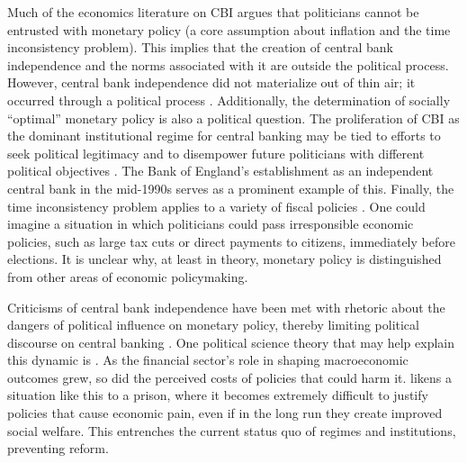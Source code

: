 \documentclass[12pt,a4paper]{article}
\begin{document}
\begin{doublespace}



Much of the economics literature on CBI argues that politicians cannot be entrusted with monetary policy (a core assumption about inflation and the time inconsistency problem). This implies that the creation of central bank independence and the norms associated with it are outside the political process. However, central bank independence did not materialize out of thin air; it occurred through a political process \parencite{mcnamara_rational_2002}. Additionally, the determination of socially ``optimal'' monetary policy is also a political question. The proliferation of CBI as the dominant institutional regime for central banking may be tied to efforts to seek political legitimacy and to disempower future politicians with different political objectives \parencite{dellepiane-avellaneda_gordon_2013}. The Bank of England's establishment as an independent central bank in the mid-1990s serves as a prominent example of this. Finally, the time inconsistency problem applies to a variety of fiscal policies \parencite{berman_bank_1999}. One could imagine a situation in which politicians could pass irresponsible economic policies, such as large tax cuts or direct payments to citizens, immediately before elections. It is unclear why, at least in theory, monetary policy is distinguished from other areas of economic policymaking.



Criticisms of central bank independence have been met with rhetoric about the dangers of political influence on monetary policy, thereby limiting political discourse on central banking \parencite{woodruff_democratize_2019}. One political science theory that may help explain this dynamic is \textcite{lindblom_market_1982}. As the financial sector's role in shaping macroeconomic outcomes grew, so did the perceived costs of policies that could harm it. \textcite{lindblom_market_1982} likens a situation like this to a prison, where it becomes extremely difficult to justify policies that cause economic pain, even if in the long run they create improved social welfare. This entrenches the current status quo of regimes and institutions, preventing reform.



\end{doublespace}
\end{document}
